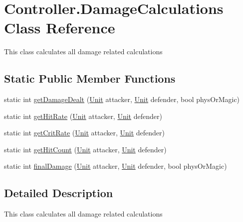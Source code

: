 \hypertarget{class_controller_1_1_damage_calculations}{}\section{Controller.\+Damage\+Calculations Class Reference}
\label{class_controller_1_1_damage_calculations}


This class calculates all damage related calculations  


\subsection*{Static Public Member Functions}
\begin{DoxyCompactItemize}
\item 
static int \hyperlink{class_controller_1_1_damage_calculations_acdba16963fcb012c9ca44635e98b2e08}{get\+Damage\+Dealt} (\hyperlink{interface_model_1_1_unit_module_1_1_unit}{Unit} attacker, \hyperlink{interface_model_1_1_unit_module_1_1_unit}{Unit} defender, bool phys\+Or\+Magic)
\item 
static int \hyperlink{class_controller_1_1_damage_calculations_ae499eeb9d40af6df4309bccbe5d20f5c}{get\+Hit\+Rate} (\hyperlink{interface_model_1_1_unit_module_1_1_unit}{Unit} attacker, \hyperlink{interface_model_1_1_unit_module_1_1_unit}{Unit} defender)
\item 
static int \hyperlink{class_controller_1_1_damage_calculations_a82f0d57d7fa391dc3fe6cd88b790321d}{get\+Crit\+Rate} (\hyperlink{interface_model_1_1_unit_module_1_1_unit}{Unit} attacker, \hyperlink{interface_model_1_1_unit_module_1_1_unit}{Unit} defender)
\item 
static int \hyperlink{class_controller_1_1_damage_calculations_a5696e76782491cae7790a824c686d3a6}{get\+Hit\+Count} (\hyperlink{interface_model_1_1_unit_module_1_1_unit}{Unit} attacker, \hyperlink{interface_model_1_1_unit_module_1_1_unit}{Unit} defender)
\item 
static int \hyperlink{class_controller_1_1_damage_calculations_a70890de40fb7272141934e19a631d9d6}{final\+Damage} (\hyperlink{interface_model_1_1_unit_module_1_1_unit}{Unit} attacker, \hyperlink{interface_model_1_1_unit_module_1_1_unit}{Unit} defender, bool phys\+Or\+Magic)
\end{DoxyCompactItemize}


\subsection{Detailed Description}
This class calculates all damage related calculations 



